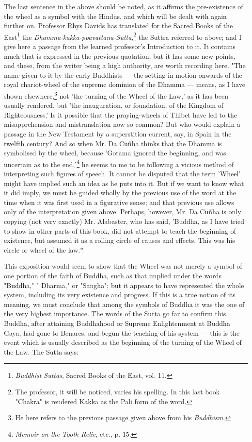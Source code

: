 \documentclass[a4paper, 11pt, oneside, polutonikogreek, english]{article}
\begin{document}
The last sentence in the above should be noted, as it affirms the pre-existence of the wheel as a symbol with the Hindus, and which will be dealt with again further on. Professor Rhys Davids has translated for the Sacred Books of the East\footnote{\emph{Buddhist Suttas}, Sacred Books of the East, vol. 11.} the \emph{Dhamma-kakka-ppavattana-Sutta},\footnote{The professor, it will be noticed, varies his spelling. In this last book "Chakra" is rendered Kakka as the Pāli form of the word.} the Suttra referred to above; and I give here a passage from the learned professor's Introduction to it. It contains much that is expressed in the previous quotation, but it has some new points, and these, from the writer being a high authority, are worth recording here. "The name given to it by the early Buddhists --- the setting in motion onwards of the royal chariot-wheel of the supreme dominion of the Dhamma --- means, as I have shown elsewhere,\footnote{He here refers to the previous passage given above from his \emph{Buddhism}.} not 'the turning of the Wheel of the Law,' as it has been usually rendered, but 'the inauguration, or foundation, of the Kingdom of Righteousness.' Is it possible that the praying-wheels of Thibet have led to the misapprehension and mistranslation now so common? But who would explain a passage in the New Testament by a superstition current, say, in Spain in the twelfth century? And so when Mr. Da Cuñha thinks that the Dhamma is symbolised by the wheel, because 'Gotama ignored the beginning, and was uncertain as to the end,'\footnote{\emph{Memoir on the Tooth Relic}, etc., p. 15.} he seems to me to be following a vicious method of interpreting such figures of speech. It cannot be disputed that the term 'Wheel' might have implied such an idea as he puts into it. But if we want to know what it did imply, we must be guided wholly by the previous use of the word at the time when it was first used in a figurative sense; and that previous use allows only of the interpretation given above. Perhaps, however, Mr. Da Cuñha is only copying (not very exactly) Mr. Alabaster, who has said, 'Buddha, as I have tried to show in other parts of this book, did not attempt to teach the beginning of existence, but assumed it as a rolling circle of causes and effects. This was his circle or wheel of the law.'"

This exposition would seem to show that the Wheel was not merely a symbol of one portion of the faith of Buddha, such as that implied under the words "Buddha," " Dharma," or "Sangha"; but it appears to have represented the whole system, including its very existence and progress. If this is a true notion of its meaning, we must conclude that among the symbols of Buddha it was the one of the very highest importance. The words of the Sutta go far to confirm this. Buddha, after attaining Buddhahood or Supreme Enlightenment at Buddha Gaya, had gone to Benares, and begun the teaching of his system --- this is the event which is usually described as the beginning of the turning of the Wheel of the Law. The Sutta says: 
\end{document}
